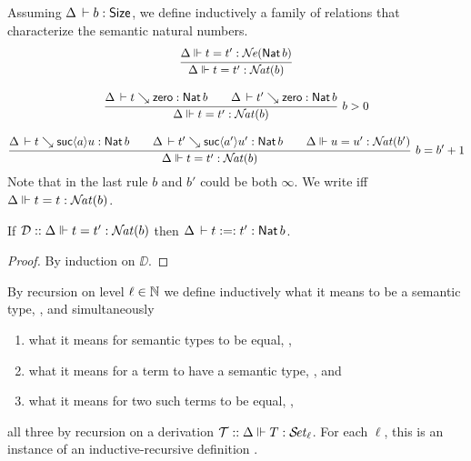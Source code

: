 \documentclass[acmlarge,review,anonymous]{acmart}\settopmatter{printfolios=true}
\begin{document}
Assuming $\Delta \,\vdash b : \mathsf{Size}$, we define inductively a family  of relations that characterize the semantic natural numbers.
\begin{gather*}
  \ru{\sneq \Delta t {t'} {\Nat b}
    }{\snateq \Delta t {t'} b
    }
\\[2ex]
  \rux{\Delta \der t \evalsto \tzero : \Nat b \qquad
      \Delta \der t' \evalsto \tzero : \Nat b
    }{\snateq \Delta t {t'} b
    }{b > 0}
\\[2ex]
  \rux{\Delta \der t \evalsto \suc a u : \Nat b \qquad
      \Delta \der t' \evalsto \suc{a'}{u'} : \Nat b \qquad
      \snateq \Delta u {u'} {b'}
    }{\snateq \Delta t {t'} b
    }{b = b' + 1}
\end{gather*}
Note that in the last rule $b$ and $b'$ could be both $\infty$.
We write  iff $\Delta \Vdash t = t : {\mathcal{N}\!\mathit{at}}(b)$.

\begin{lemma}
  If\/ $\mathcal{D} :: \Delta \Vdash t = t' : {\mathcal{N}\!\mathit{at}}(b)$ then $\Delta \,\vdash t :=: t' : \mathsf{Nat}\, b$.
\end{lemma}
\begin{proof}
  By induction on $\DD$.
\end{proof}

By recursion on level $\ell \in \mathbb{N}$ we define inductively what it means to be a semantic type, , and simultaneously
\begin{enumerate}
\item what it means for semantic types to be equal, ,
\item what it means for a term to have a semantic type, , and
\item what it means for two such terms to be equal, ,
\end{enumerate}
all three by recursion on a derivation $\mathcal{T} :: \Delta \Vdash T : {\mathcal{S}\!\mathit{et}_{\ell}}$.
For each $\ell$, this is an instance of an inductive-recursive definition \cite{dybjer:jsl00}.
\end{document}
